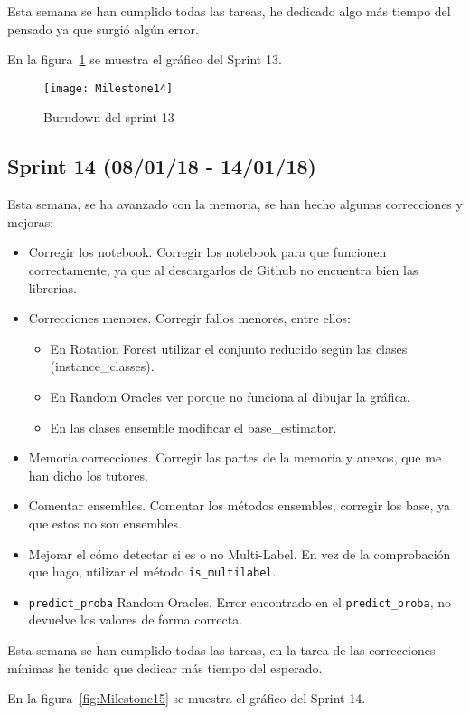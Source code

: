 Esta semana se han cumplido todas las tareas, he dedicado algo más tiempo del pensado ya que surgió algún error.

En la figura~\ref{fig:Milestone14} se muestra el gráfico del Sprint 13.

\begin{figure}
\centering
\texttt{[image: Milestone14]}
\caption{Burndown del sprint 13}
\label{fig:Milestone14}
\end{figure}

\subsection{Sprint 14 (08/01/18 - 14/01/18)}
Esta semana, se ha avanzado con la memoria, se han hecho algunas correcciones y mejoras:
\begin{itemize}
\item Corregir los notebook. Corregir los notebook para que funcionen correctamente, ya que al descargarlos de Github no encuentra bien las librerías.
\item Correcciones menores. Corregir fallos menores, entre ellos:
	\begin{itemize}
		\item En Rotation Forest utilizar el conjunto reducido según las clases (instance\_classes).
		\item En Random Oracles ver porque no funciona al dibujar la gráfica.
		\item En las clases ensemble modificar el base\_estimator.
	\end{itemize}
\item Memoria correcciones. Corregir las partes de la memoria y anexos, que me han dicho los tutores.
\item Comentar ensembles. Comentar los métodos ensembles, corregir los base, ya que estos no son ensembles.
\item Mejorar el cómo detectar si es o no Multi-Label. En vez de la comprobación que hago, utilizar el método \texttt{is\_multilabel}.
\item \texttt{predict\_proba} Random Oracles. Error encontrado en el \texttt{predict\_proba}, no devuelve los valores de forma correcta.
\end{itemize}

Esta semana se han cumplido todas las tareas, en la tarea de las correcciones mínimas he tenido que dedicar más tiempo del esperado.

En la figura~\ref{fig:Milestone15} se muestra el gráfico del Sprint 14.

